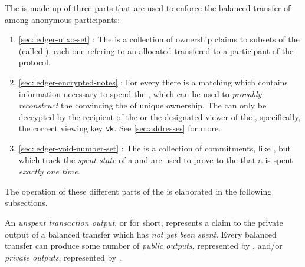 The \ShieldedAssetPool{} is made up of three parts that are used to enforce the balanced transfer of  among anonymous participants:

\begin{enumerate}
    \item \autoref{sec:ledger-utxo-set} \TUTXOSet{}: The \TUTXOSet{} is a collection of ownership claims to subsets of the \ShieldedAssetPool{} (called ), each one refering to an allocated \SecretAsset{} transfered to a participant of the protocol.
    \item \autoref{sec:ledger-encrypted-notes} : For every \UTXO{} there is a matching \EncryptedNote{} which contains information necessary to spend the \SecretAsset{}, which can be used to \emph{provably reconstruct} the \UTXO{} convincing the \Ledger{} of unique ownership. The \EncryptedNote{} can only be decrypted by the recipient of the \SecretAsset{} or the designated viewer of the \UTXO{}, specifically, the correct viewing key ${\textsf{vk}}$. See \autoref{sec:addresses} for more.
    \item \autoref{sec:ledger-void-number-set} \VoidNumberSet{}: The \VoidNumberSet{} is a collection of commitments, like , but which track the \emph{spent state} of a \SecretAsset{} and are used to prove to the \Ledger{} that a \SecretAsset{} is spent \emph{exactly one time}. 
\end{enumerate}

The operation of these different parts of the \ShieldedAssetPool{} is elaborated in the following subsections.


An \emph{unspent transaction output}, or \UTXO{} for short, represents a claim to the private output of a balanced transfer which has 
\emph{not yet been spent}. Every balanced transfer can produce some number of \emph{public outputs}, represented by , and/or 
\emph{private outputs}, represented by .


